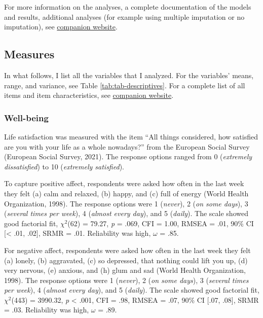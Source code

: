 \documentclass[
  man,mask]{apa7}
\begin{document}
For more information on the analyses, a complete documentation of the models and results, additional analyses (for example using multiple imputation or no imputation), see \href{https://XMtRA.github.io/Austrian_Corona_Panel_Project}{companion website}.

\hypertarget{measures}{%
\subsection{Measures}\label{measures}}

In what follows, I list all the variables that I analyzed.
For the variables' means, range, and variance, see Table \ref{tab:tab-descriptives}.
For a complete list of all items and item characteristics, see \href{https://XMtRA.github.io/Austrian_Corona_Panel_Project}{companion website}.

\hypertarget{well-being}{%
\subsubsection{Well-being}\label{well-being}}

Life satisfaction was measured with the item ``All things considered, how satisfied are you with your life as a whole nowadays?'' from the European Social Survey (European Social Survey, 2021).
The response options ranged from 0 (\emph{extremely dissatisfied}) to 10 (\emph{extremely satisfied}).

To capture positive affect, respondents were asked how often in the last week they felt (a) calm and relaxed, (b) happy, and (c) full of energy (World Health Organization, 1998).
The response options were 1 (\emph{never}), 2 (\emph{on some days}), 3 (\emph{several times per week}), 4 (\emph{almost every day}), and 5 (\emph{daily}).
The scale showed good factorial fit, \(\chi^2\)(62) = 79.27, \emph{p} = .069, CFI = 1.00, RMSEA = .01, 90\% CI {[}\textless{} .01, .02{]}, SRMR = .01.
Reliability was high, \(\omega\) = .85.

For negative affect, respondents were asked how often in the last week they felt (a) lonely, (b) aggravated, (c) so depressed, that nothing could lift you up, (d) very nervous, (e) anxious, and (h) glum and sad (World Health Organization, 1998).
The response options were 1 (\emph{never}), 2 (\emph{on some days}), 3 (\emph{several times per week}), 4 (\emph{almost every day}), and 5 (\emph{daily}).
The scale showed good factorial fit, \(\chi^2\)(443) = 3990.32, \emph{p} \textless{} .001, CFI = .98, RMSEA = .07, 90\% CI {[}.07, .08{]}, SRMR = .03.
Reliability was high, \(\omega\) = .89.
\end{document}
